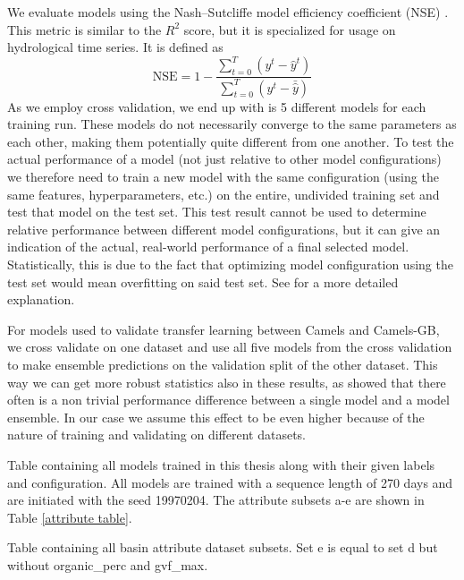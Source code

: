 We evaluate models using the Nash–Sutcliffe model efficiency coefficient (NSE) \citep{NSE}.
This metric is similar to the $R^2$ score, but it is specialized for usage 
on hydrological time series.
It is defined as 
\begin{equation}
    \text{NSE} = 1 - \frac{\sum_{t=0}^T\left( y^t - \hat{y}^t\right)}{\sum_{t=0}^T\left(y^t - \bar{\hat{y}}\right)} \label{NSE}
\end{equation}
As we employ cross validation, we  end up with is 5 different models 
for each training run. These models do not necessarily converge to the same parameters 
as each other, making them potentially quite different from one another. To test the 
actual performance of a model (not just relative to other model configurations) we 
therefore need to train a new model with the same configuration (using the same features, 
hyperparameters, etc.) on the entire, undivided training set and test that model 
on the test set. This test result cannot be used to determine relative performance 
between different model configurations, but it can give an indication of the actual, 
real-world performance of a final selected model. Statistically, this is due to the 
fact that optimizing model configuration using the test set would mean overfitting 
on said test set. See \citet{elemstatlearn} for a more detailed explanation.

For models used to validate transfer learning between Camels and Camels-GB, we 
cross validate on one dataset and use all five models from the cross validation 
to make ensemble predictions on the validation split of the other dataset. This 
way we can get more robust statistics also in these results, as \citet{lstm_second_paper} 
showed that there often is a non trivial performance difference between a single
model and a model ensemble. In our case we assume this effect to be even higher 
because of the nature of training and validating on different datasets.

\begin{table}
    \centering
    \caption{Table containing all models trained in this thesis along with their 
    given labels and configuration. All models are trained with a sequence length of 
    270 days and are initiated with the seed 19970204. 
    The attribute subsets a-e are shown in Table \ref{attribute table}.}
    
    \label{all models}
\end{table}
\begin{landscape}
\begin{table}
    \centering
    \caption{Table containing all basin attribute dataset subsets. Set e is equal 
    to set d but without organic\_perc and gvf\_max.}
    
    \label{attribute table}
\end{table}
\end{landscape}


